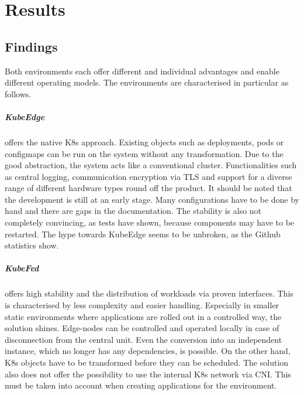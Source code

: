 \documentclass[MSC,Master,english]{twbook}%
\begin{document}
\chapter{Results}
\label{chap:results}

\section{Findings}
\label{sec:findings}
Both environments each offer different and individual advantages and enable different operating models. The environments are characterised in particular as follows.

\paragraph{KubeEdge} offers the native \ac{K8s} approach. Existing objects such as deployments, pods or configmaps can be run on the system without any transformation. Due to the good abstraction, the system acts like a conventional cluster. Functionalities such as central logging, communication encryption via TLS and support for a diverse range of different hardware types round off the product. It should be noted that the development is still at an early stage. Many configurations have to be done by hand and there are gaps in the documentation. The stability is also not completely convincing, as tests have shown, because components may have to be restarted. The hype towards KubeEdge seems to be unbroken, as the Github statistics show.

\paragraph{KubeFed} offers high stability and the distribution of workloads via proven interfaces. This is characterised by less complexity and easier handling. Especially in smaller static environments where applications are rolled out in a controlled way, the solution shines. Edge-nodes can be controlled and operated locally in case of disconnection from the central unit. Even the conversion into an independent instance, which no longer has any dependencies, is possible. On the other hand, \ac{K8s} objects have to be transformed before they can be scheduled. The solution also does not offer the possibility to use the internal \ac{K8s} network via \ac{CNI}. This must be taken into account when creating applications for the environment.
\end{document}
